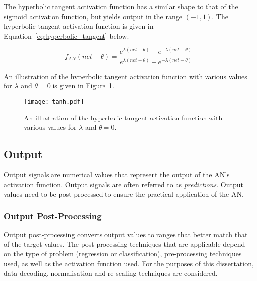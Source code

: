 The hyperbolic tangent activation function has a similar shape to that of the sigmoid activation function, but yields output in the range $(-1, 1)$. The hyperbolic tangent activation function is given in Equation~\eqref{eq:hyperbolic_tangent} below.

\begin{equation}
      f_{AN}(net - \theta) = \frac{e^{\lambda(net - \theta)}-e^{-\lambda(net - \theta)}}{e^{\lambda(net - \theta)}+e^{-\lambda(net - \theta)}}
      \label{eq:hyperbolic_tangent}
\end{equation}

\noindent
An illustration of the hyperbolic tangent activation function with various values for $\lambda$ and $\theta = 0$ is given in Figure~\ref{fig:anns:activation_functions:hyperbolic_tangent}.


\begin{figure}[htpb]
      \centering
      \texttt{[image: tanh.pdf]}
      \caption[The hyperbolic tangent activation function]{An illustration of the hyperbolic tangent activation function with various values for $\lambda$ and $\theta = 0$.}
      \label{fig:anns:activation_functions:hyperbolic_tangent}
\end{figure}


\subsection{Output}\label{sec:anns:an:output}

Output signals are numerical values that represent the output of the \acs{AN}'s activation function. Output signals are often referred to as \textit{predictions}. Output values need to be post-processed to ensure the practical application of the \acs{AN}.

\subsubsection{Output Post-Processing}\label{sec:anns:an:output:output_post_processing}

Output post-processing converts output values to ranges that better match that of the target values. The post-processing techniques that are applicable depend on the type of problem (regression or classification), pre-processing techniques used, as well as the activation function used. For the purposes of this dissertation, data decoding, normalisation and
re-scaling techniques are considered.



